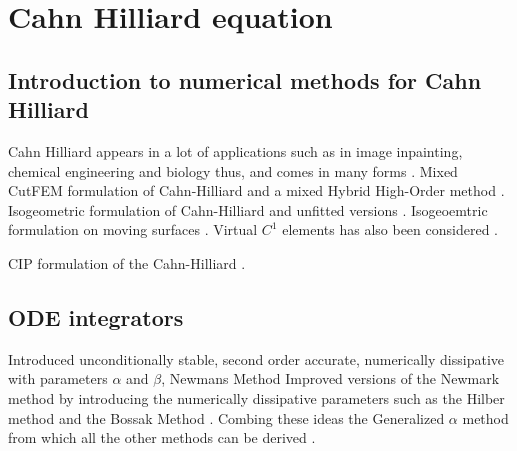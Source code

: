 
\newpage
\section{Cahn Hilliard equation }%
\label{sec:cahn_hilliard_equation}


\subsection{Introduction to numerical methods for Cahn Hilliard}%
\label{sub:introduction_to_numerical_methods_for_cahn_hilliard}

Cahn Hilliard appears in a lot of applications such as in image inpainting, chemical engineering and biology \cite{bressloff2014stochastic} thus, and comes in many forms \cite{miranville2017cahn}.
Mixed CutFEM formulation of Cahn-Hilliard \cite{karatzas2021reduced} and a mixed Hybrid High-Order method \cite{chave2016hybrid}. Isogeometric formulation of Cahn-Hilliard \cite{kastner2016isogeometric, gomez2008isogeometric} and unfitted versions \cite{zhao2017variational}. Isogeoemtric formulation on moving
surfaces \cite{zimmermann2019isogeometric}. Virtual $C^{1}$  elements has also been considered \cite{antonietti2016c}.

CIP formulation of the Cahn-Hilliard \cite{wells2006discontinuous}.


\subsection{ODE integrators}%
\label{sub:ode_integrators}

      Introduced unconditionally stable, second order accurate, numerically dissipative with parameters $\alpha$ and $ \beta $,  Newmans Method \cite{newmark1959method}
    Improved versions of the Newmark method by introducing the numerically dissipative parameters such as the Hilber method and the Bossak Method \cite{hilber1977improved, wood1980alpha}. Combing these ideas the Generalized $\alpha $ method from which all the other methods can be derived \cite{chung1993time}.


\newpage

